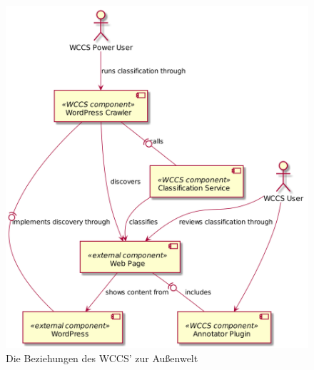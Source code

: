         \begin{figure}[htb]
            \centering
            \includegraphics[scale=\imageScalingFactor]{../resources/architecture/external_architecture.png}
            \caption{Die Beziehungen des WCCS' zur Außenwelt}
            \label{image:wccsExternalArchitecture}
        \end{figure}